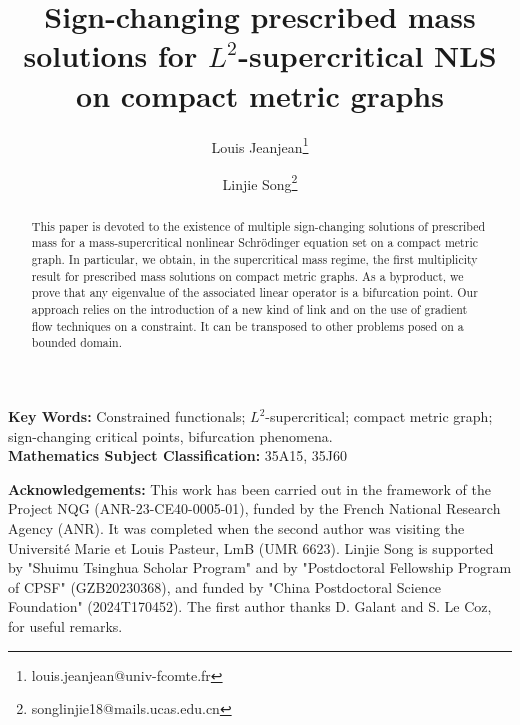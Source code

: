 \documentclass[10pt,a4paper]{article}
\theoremstyle{definition} \theoremstyle{remark}
\numberwithin{equation}{section}
\begin{document}
\title{Sign-changing prescribed mass solutions for $L^2$-supercritical NLS on compact metric graphs
}

\author{Louis Jeanjean\footnote{louis.jeanjean@univ-fcomte.fr}}  

\author{Linjie Song\footnote{songlinjie18@mails.ucas.edu.cn}}  
	
	
\date{}	
\maketitle


\begin{abstract}
	This paper is devoted to the existence of multiple sign-changing solutions of prescribed mass for a mass-supercritical nonlinear Schr\"odinger equation set on a compact metric graph. In particular, we obtain, in the supercritical mass regime, the first multiplicity result for prescribed mass solutions on compact metric graphs. As a byproduct, we prove that any eigenvalue of the associated linear operator is a bifurcation point. Our approach relies on the introduction of a new kind of link and on the use of gradient flow techniques on a constraint. It can be transposed to other problems posed on a bounded domain.
\end{abstract}

\medskip

{\small \noindent \textbf{Key Words:} Constrained functionals; $L^2$-supercritical; compact metric graph; sign-changing critical points, bifurcation phenomena.\\
\textbf{Mathematics Subject Classification:} 35A15, 35J60}

\medskip

{\small \noindent \textbf{Acknowledgements:} This work has been carried out in the framework of the Project NQG (ANR-23-CE40-0005-01), funded by the French National Research Agency (ANR). It was completed when the second author was visiting the Universit\'e Marie et Louis Pasteur, LmB (UMR 6623). Linjie Song is supported by "Shuimu Tsinghua Scholar Program" and by "Postdoctoral Fellowship Program of CPSF" (GZB20230368), and funded by "China Postdoctoral Science Foundation" (2024T170452). The first author thanks D. Galant and S. Le Coz, for useful remarks.}
\end{document}
